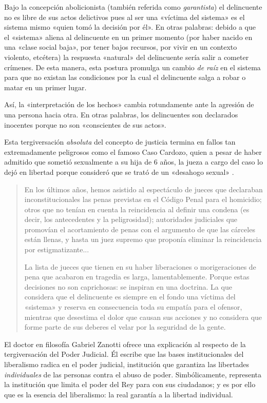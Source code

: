 \documentclass[12pt,a4paper,twoside]{book}
\begin{document}
Bajo la concepción abolicionista (también referida como \textit{garantista}) el delincuente no es libre de sus actos delictivos pues al ser una «víctima del sistema» es el sistema mismo «quien tomó la decisión por él». En otras palabras: debido a que el «sistema» aliena al delincuente en un primer momento (por haber nacido en una «clase social baja», por tener bajos recursos, por vivir en un contexto violento, etcétera) la respuesta «natural» del delincuente sería salir a cometer crímenes. De esta manera, esta postura promulga un cambio \textit{de raíz} en el sistema para que no existan las condiciones por la cual el delincuente salga a robar o matar en un primer lugar.

Así, la «interpretación de los hechos» cambia rotundamente ante la agresión de una persona hacia otra. En otras palabras, los delincuentes son declarados inocentes porque no son «conscientes de sus actos».

Esta tergiversación \textit{absoluta} del concepto de justicia termina en fallos tan extremadamente peligrosos como el famoso Caso Cardozo, quien a pesar de haber admitido que sometió sexualmente a su hija de 6 años, la jueza a cargo del caso lo dejó en libertad porque consideró que se trató de un «desahogo sexual» \cite{caso:cardozo}.

\begin{quotation}
En los últimos años, hemos asistido al espectáculo de jueces que declaraban inconstitucionales las penas previstas en el Código Penal para el homicidio; otros que no tenían en cuenta la reincidencia al definir una condena (es decir, los antecedentes y la peligrosidad); autoridades judiciales que promovían el acortamiento de penas con el argumento de que las cárceles están llenas, y hasta un juez supremo que proponía eliminar la reincidencia por estigmatizante...

La lista de jueces que tienen en su haber liberaciones o morigeraciones de pena que acabaron en tragedia es larga, lamentablemente. Porque estas decisiones no son caprichosas: se inspiran en una doctrina. La que considera que el delincuente es siempre en el fondo una víctima del «sistema» y reserva en consecuencia toda su empatía para el ofensor, mientras que desestima el dolor que causan sus acciones y no considera que forme parte de sus deberes el velar por la seguridad de la gente. \cite{caso:jueces}
\end{quotation}

El doctor en filosofía Gabriel Zanotti ofrece una explicación al respecto de la tergiversación del Poder Judicial. Él escribe que las bases institucionales del liberalismo radica en el poder judicial, institución que garantiza las libertades \textit{individuales} de las personas contra el abuso de poder. Simbólicamente, representa la institución que limita el poder del Rey para con sus ciudadanos; y es por ello que es la esencia del liberalismo: la real garantía a la libertad individual.
\end{document}
